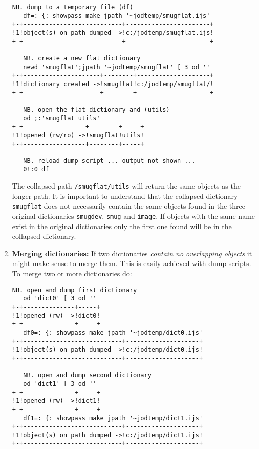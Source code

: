 \begin{enumerate}
\begin{tcolorbox}[breakable, size=fbox, boxrule=1pt, pad at break*=1mm,colback=cellbackground, colframe=cellborder]
\begin{lstlisting}[language=jdoc, frame=single,framerule=0pt,label=lst:scr5077X2]
   NB. dump to a temporary file (df)   
   df=: {: showpass make jpath '~jodtemp/smugflat.ijs'
+-+---------------------------+-----------------------+
!1!object(s) on path dumped ->!c:/jodtemp/smugflat.ijs!
+-+---------------------------+-----------------------+

   NB. create a new flat dictionary   
   newd 'smugflat';jpath '~jodtemp/smugflat' [ 3 od ''
+-+---------------------+--------+--------------------+
!1!dictionary created ->!smugflat!c:/jodtemp/smugflat/!
+-+---------------------+--------+--------------------+

   NB. open the flat dictionary and (utils)   
   od ;:'smugflat utils'
+-+-----------------+--------+-----+
!1!opened (rw/ro) ->!smugflat!utils!
+-+-----------------+--------+-----+

   NB. reload dump script ... output not shown ...     
   0!:0 df
\end{lstlisting}
\end{tcolorbox}

  The collapsed path \texttt{/smugflat/utils} will return the same
  objects as the longer path. It is important to understand that the
  collapsed dictionary \texttt{smugflat} does not necessarily contain
  the same objects found in the three original dictionaries
  \texttt{smugdev}, \texttt{smug} and \texttt{image}. If objects with
  the same name exist in the original dictionaries only the first one
  found will be in the collapsed dictionary.
\item
  \textbf{Merging dictionaries:} If two dictionaries \emph{contain no
  overlapping objects} it might make sense to merge them. This is easily
  achieved with dump scripts. To merge two or more dictionaries do:

\begin{tcolorbox}[breakable, size=fbox, boxrule=1pt, pad at break*=1mm,colback=cellbackground, colframe=cellborder]
\begin{lstlisting}[language=jdoc, frame=single,framerule=0pt,label=lst:scr5077X3]
   NB. open and dump first dictionary   
   od 'dict0' [ 3 od ''
+-+--------------+-----+
!1!opened (rw) ->!dict0!
+-+--------------+-----+   
   df0=: {: showpass make jpath '~jodtemp/dict0.ijs'
+-+---------------------------+--------------------+
!1!object(s) on path dumped ->!c:/jodtemp/dict0.ijs!
+-+---------------------------+--------------------+

   NB. open and dump second dictionary   
   od 'dict1' [ 3 od ''
+-+--------------+-----+
!1!opened (rw) ->!dict1!
+-+--------------+-----+   
   df1=: {: showpass make jpath '~jodtemp/dict1.ijs'
+-+---------------------------+--------------------+
!1!object(s) on path dumped ->!c:/jodtemp/dict1.ijs!
+-+---------------------------+--------------------+


\end{lstlisting}
\end{tcolorbox}
\end{enumerate}
